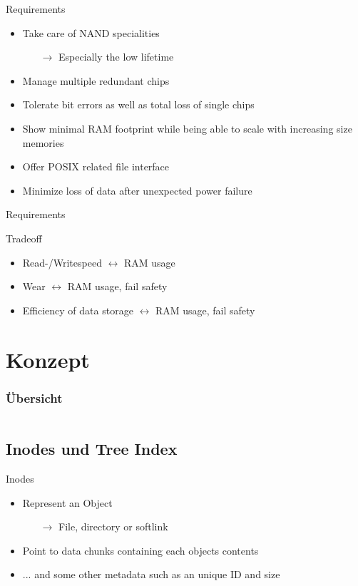 \documentclass[
	,footlinenumber
	,navline=true
	,footlineauthor
	,ngerman
	]{beamer}
\newcommand{\zwischenUebersicht}
{
   \begin{frame}
        \frametitle{\"Ubersicht}
	\note{
        \tableofcontents[ 
    		currentsubsection, 
		hideothersubsections,
   		sectionstyle=show/hide, 
		] 
	}
	\begin{columns}[t]
        \begin{column}{.5\textwidth}
            \tableofcontents[subsectionstyle=show,hideothersubsections,sectionstyle=show/shaded,sections={1-3}]
        \end{column}
        \begin{column}{.5\textwidth}
            \tableofcontents[subsectionstyle=show,hideothersubsections,sectionstyle=show/shaded,sections={4-6}]
        \end{column}
    \end{columns}
   \end{frame}
}
\begin{document}
\begin{frame}{Requirements}
	\begin{block}{}
		\begin{itemize}
			\item Take care of NAND specialities
			\begin{itemize}
				\item[$\rightarrow$] Especially the low lifetime
			\end{itemize}
			\item Manage multiple redundant chips
			\item Tolerate bit errors as well as total loss of single chips
			\item Show minimal RAM footprint while being able to scale with increasing size memories
			\item Offer POSIX related file interface
			\item Minimize loss of data after unexpected power failure
		\end{itemize}
	\end{block}
\end{frame}

\begin{frame}{Requirements}
	\begin{block}{Tradeoff}
		\begin{itemize}
			\item Read-/Writespeed $\longleftrightarrow$ RAM usage
			\item Wear $\longleftrightarrow$ RAM usage, fail safety
			\item Efficiency of data storage $\longleftrightarrow$ RAM usage, fail safety
		\end{itemize}
	\end{block}
\end{frame}


\section{Konzept}
\zwischenUebersicht
\subsection{Inodes und Tree Index}
\begin{frame}{Inodes}
	\begin{block}{}
		\begin{itemize}
			\item Represent an Object
			\begin{itemize}
				\item[$\rightarrow$] File, directory or softlink
			\end{itemize}
			\item Point to data chunks containing each objects contents
			\item ... and some other metadata such as an unique ID and size
		\end{itemize}
		
	\end{block}
\end{frame}
\end{document}

